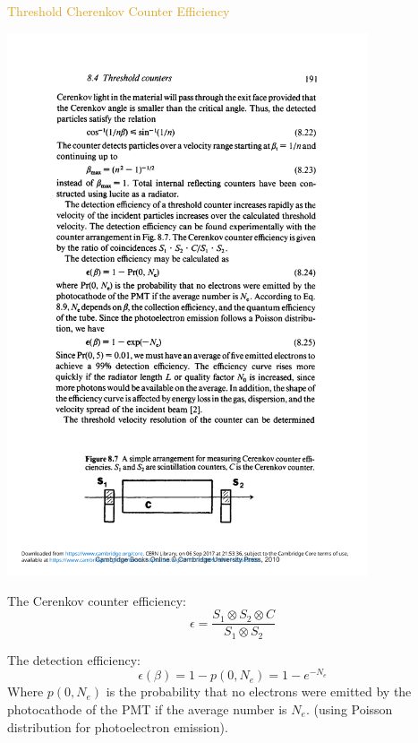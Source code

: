 \documentclass[11pt]{beamer} %
\renewcommand{\(}{\begin{columns}}
\renewcommand{\)}{\end{columns}}
\newcommand{\<}[1]{\begin{column}{#1}}
\renewcommand{\>}{\end{column}}
\begin{document}
\begin{frame}{\textcolor{Goldenrod}{Threshold Cherenkov Counter
      Efficiency}}
  \begin{center}
    \includegraphics[width=0.8\textwidth,
    height=0.25\textheight]{./Images/threshold_detector_eff}\\
  \end{center}
  The Cerenkov counter efficiency:
  \[
    \epsilon =  \frac{S_1 \otimes S_2 \otimes C} {S_1 \otimes S_2}
  \]
  
  The detection efficiency:
  \[
    \epsilon(\beta) = 1 - p(0, N_e) = 1 - e^{-N_e}
  \]
  {\scriptsize
    Where $p(0, N_e)$ is the probability that no electrons were emitted by
    the photocathode of the PMT if the average number is $N_e$.
    (using Poisson distribution for photoelectron emission).
  }
\end{frame}
\end{document}
